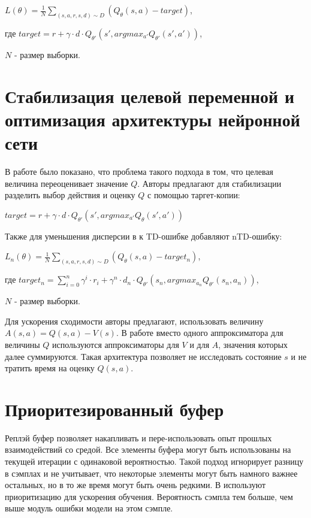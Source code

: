 \documentclass{mipt-thesis-bs}
\begin{document}
\begin{center}
    
$L(\theta)=\frac{1}{N}\sum_{(s,a,r,s,d) \sim D} (Q_\theta(s, a) - target)$,

где $target = r + \gamma\cdot d \cdot Q_{\theta'}(s',argmax_{a'}Q_{\theta'}(s',a'))$,

$N$ - размер выборки.
\end{center}

\section{Стабилизация целевой переменной и оптимизация архитектуры нейронной сети}

В работе \cite{Double DQN} было показано, что проблема такого подхода в том, что целевая величина переоценивает значение $Q$. Авторы предлагают для стабилизации разделить выбор действия и оценку $Q$ с помощью таргет-копии:

\begin{center}
$target = r + \gamma\cdot d \cdot Q_{\theta'}(s',argmax_{a'}Q_{\theta}(s',a'))$ 
\end{center}

Также для уменьшения дисперсии в \cite{N-step return} к TD-ошибке добавляют nTD-ошибку:

\begin{center}
$L_n(\theta)=\frac{1}{N}\sum_{(s,a,r,s,d) \sim D} (Q_\theta(s, a) - target_n)$,

где $target_n = \sum_{i=0}^{n}\gamma^i\cdot r_i + \gamma^n\cdot d_n \cdot Q_{\theta'}(s_n,argmax_{a_n}Q_{\theta'}(s_n,a_n))$,

$N$ - размер выборки.
\end{center}

Для ускорения сходимости авторы \cite{Dueling DQN} предлагают, использовать величину $A(s,a)=Q(s,a) - V(s)$. В работе вместо одного аппроксиматора для величины $Q$ используются аппроксиматоры для $V$ и для $A$, значения которых далее суммируются. Такая архитектура позволяет не исследовать состояние $s$ и не тратить время на оценку $Q(s,a)$.

\section{Приоритезированный буфер}

Реплэй буфер позволяет накапливать и пере-использовать опыт прошлых взаимодействий со средой. Все элементы буфера могут быть использованы на текущей итерации с одинаковой вероятностью. Такой подход игнорирует разницу в сэмплах и не учитывает, что некоторые элементы могут быть намного важнее остальных, но в то же время могут быть очень редкими. В \cite{PER} используют приоритизацию для ускорения обучения. Вероятность сэмпла тем больше, чем выше модуль ошибки модели на этом сэмпле.
\end{document}

